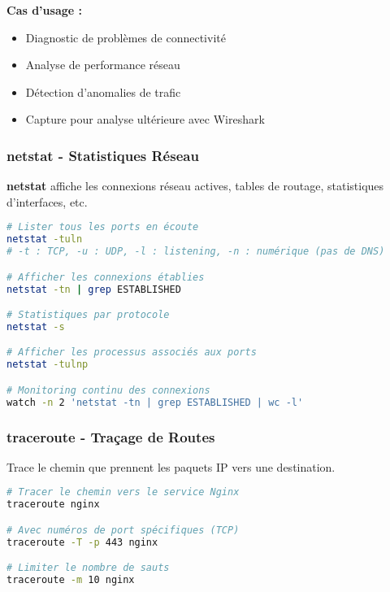 \documentclass[11pt,a4paper]{report}
\begin{document}
\textbf{Cas d'usage :}
\begin{itemize}
    \item Diagnostic de problèmes de connectivité
    \item Analyse de performance réseau
    \item Détection d'anomalies de trafic
    \item Capture pour analyse ultérieure avec Wireshark
\end{itemize}

\subsubsection{netstat - Statistiques Réseau}

\textbf{netstat} affiche les connexions réseau actives, tables de routage, statistiques d'interfaces, etc.

\begin{lstlisting}[language=bash, caption=Analyse des Connexions avec netstat]
# Lister tous les ports en écoute
netstat -tuln
# -t : TCP, -u : UDP, -l : listening, -n : numérique (pas de DNS)

# Afficher les connexions établies
netstat -tn | grep ESTABLISHED

# Statistiques par protocole
netstat -s

# Afficher les processus associés aux ports
netstat -tulnp

# Monitoring continu des connexions
watch -n 2 'netstat -tn | grep ESTABLISHED | wc -l'
\end{lstlisting}

\subsubsection{traceroute - Traçage de Routes}

Trace le chemin que prennent les paquets IP vers une destination.

\begin{lstlisting}[language=bash, caption=Traçage de Route Réseau]
# Tracer le chemin vers le service Nginx
traceroute nginx

# Avec numéros de port spécifiques (TCP)
traceroute -T -p 443 nginx

# Limiter le nombre de sauts
traceroute -m 10 nginx
\end{lstlisting}

\end{document}

